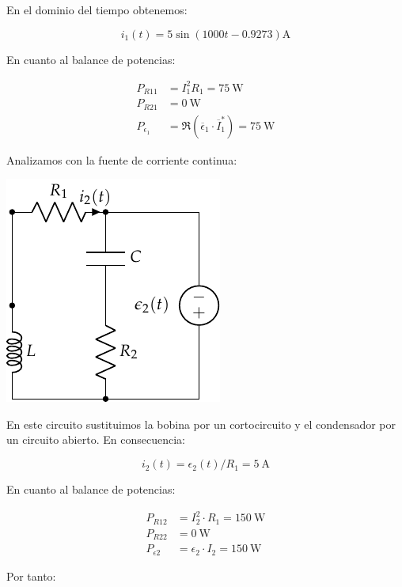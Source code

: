 En el dominio del tiempo obtenemos:

\begin{equation*}
  i_1(t) = 5\sin(1000t - 0.9273)\si{\ampere}
\end{equation*}

En cuanto al balance de potencias:

\begin{align*}
  P_{R11} &= I_1^2 R_1 = \qty{75}{\watt}\\
  P_{R21} &= \qty{0}{\watt}\\
  P_{\epsilon_1} &= \Re(\overline{\epsilon}_1 \cdot \overline{I}_1^*) = \qty{75}{\watt}
\end{align*}

Analizamos con la fuente de corriente continua:

\begin{center}
\includegraphics{figuras/superposicion1_DC}
\end{center}

En este circuito sustituimos la bobina por un cortocircuito y el condensador por un circuito abierto. En consecuencia:

\begin{equation*}
  i_2(t) = \epsilon_2(t) / R_1 = \qty{5}{\ampere}
\end{equation*}

En cuanto al balance de potencias:

\begin{align*}
  P_{R12} &= I_2^2 \cdot R_1 = \qty{150}{\watt}\\
  P_{R22} &= \qty{0}{\watt}\\
  P_{\epsilon2} &= \epsilon_2 \cdot I_2 = \qty{150}{\watt}
\end{align*}

Por tanto:

